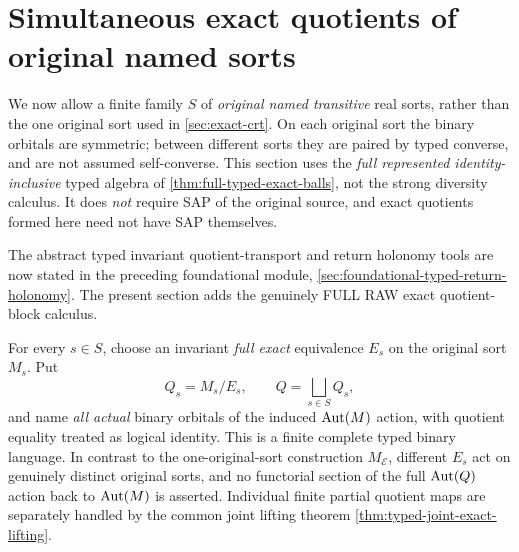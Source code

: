 \section{Simultaneous exact quotients of original named sorts}
\label{sec:typed-simultaneous-exact}

We now allow a finite family $S$ of \emph{original named transitive}
real sorts, rather than the one original sort used in
\cref{sec:exact-crt}.  On each original sort the binary orbitals
are symmetric; between different sorts they are paired by typed
converse, and are not assumed self-converse.  This section uses the
\emph{full represented identity-inclusive} typed algebra of
\cref{thm:full-typed-exact-balls}, not the strong diversity calculus.
It does \emph{not} require SAP of the original source, and exact
quotients formed here need not have SAP themselves.

\noindent The abstract typed invariant quotient-transport and return
holonomy tools are now stated in the preceding foundational module,
\cref{sec:foundational-typed-return-holonomy}. The present section
adds the genuinely FULL RAW exact quotient-block calculus.

For every $s\in S$, choose an invariant \emph{full exact}
equivalence $E_s$ on the original sort $M_s$.  Put
\[
  Q_s=M_s/E_s,\qquad Q=\bigsqcup_{s\in S}Q_s,
\]
and name \emph{all actual} binary orbitals of the induced
$\operatorname{Aut}(M)$ action, with quotient equality treated as logical
identity.  This is a finite complete typed binary language.  In
contrast to the one-original-sort construction
$M_{\mathcal E}$, different $E_s$ act on genuinely distinct
original sorts, and no functorial section of the full $\operatorname{Aut}(Q)$ action back
to $\operatorname{Aut}(M)$ is asserted.  Individual finite partial quotient
maps are separately handled by the common joint lifting theorem
\cref{thm:typed-joint-exact-lifting}.

